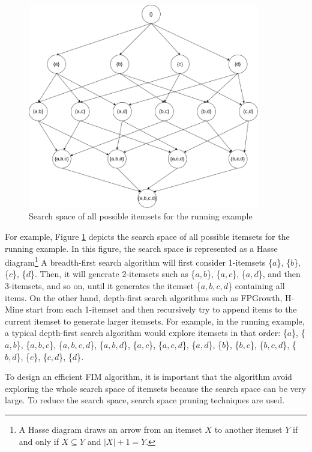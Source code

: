\begin{figure}
    \caption{Search space of all possible itemsets for the running example}
    \label{fig:search_space}
    \centering
    \includegraphics[width=0.9\textwidth]{chapter1/image/space.png}
\end{figure}

For example, Figure \ref{fig:search_space} depicts the search space of all possible itemsets for the
running example. In this figure, the search space is represented as
a Hasse diagram\footnote{A Hasse diagram draws an arrow from an itemset $X$ to another itemset $Y$ if and only if $X \subseteq Y$ and $|X| + 1 = Y$.}
A breadth-first search algorithm will first consider 1-itemsets \{$a$\}, \{$b$\}, \{$c$\}, \{$d$\}. Then,
it will generate 2-itemsets such as \{$a, b$\}, \{$a, c$\}, \{$a, d$\}, and then 3-itemsets, and so on, until it
generates the itemset \{$a, b, c, d$\} containing all items. On the other hand, depth-first search
algorithms such as FPGrowth\cite{fp_growth}, H-Mine\cite{h_mine} start from each 1-itemset and then recursively try to append items to the current itemset to generate larger itemsets.
For example, in the running example, a typical depth-first search algorithm would explore itemsets in that
order: \{$a$\}, \{$a, b$\}, \{$a, b, c$\}, \{$a, b, c, d$\}, \{$a, b, d$\},
\{$a, c$\}, \{$a, c, d$\}, \{$a, d$\}, \{$b$\}, \{$b, c$\}, \{$b, c, d$\},
\{$b, d$\}, \{$c$\}, \{$c, d$\}, \{$d$\}.

To design an efficient FIM algorithm, it is important that the algorithm avoid exploring
the whole search space of itemsets because the search space can be very large. To reduce
the search space, search space pruning techniques are used.

